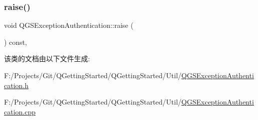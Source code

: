 \mbox{\label{class_q_g_s_exception_authentication_a91971de2b9a68b26c9efc33ae0bcbd2f}} 
\subsubsection{\texorpdfstring{raise()}{raise()}}
{\footnotesize\ttfamily void Q\+G\+S\+Exception\+Authentication\+::raise (\begin{DoxyParamCaption}{ }\end{DoxyParamCaption}) const\hspace{0.3cm}{\ttfamily [override]}, {\ttfamily [virtual]}}



该类的文档由以下文件生成\+:\begin{DoxyCompactItemize}
\item 
F\+:/\+Projects/\+Git/\+Q\+Getting\+Started/\+Q\+Getting\+Started/\+Util/\mbox{\hyperlink{_q_g_s_exception_authentication_8h}{Q\+G\+S\+Exception\+Authentication.\+h}}\item 
F\+:/\+Projects/\+Git/\+Q\+Getting\+Started/\+Q\+Getting\+Started/\+Util/\mbox{\hyperlink{_q_g_s_exception_authentication_8cpp}{Q\+G\+S\+Exception\+Authentication.\+cpp}}\end{DoxyCompactItemize}
